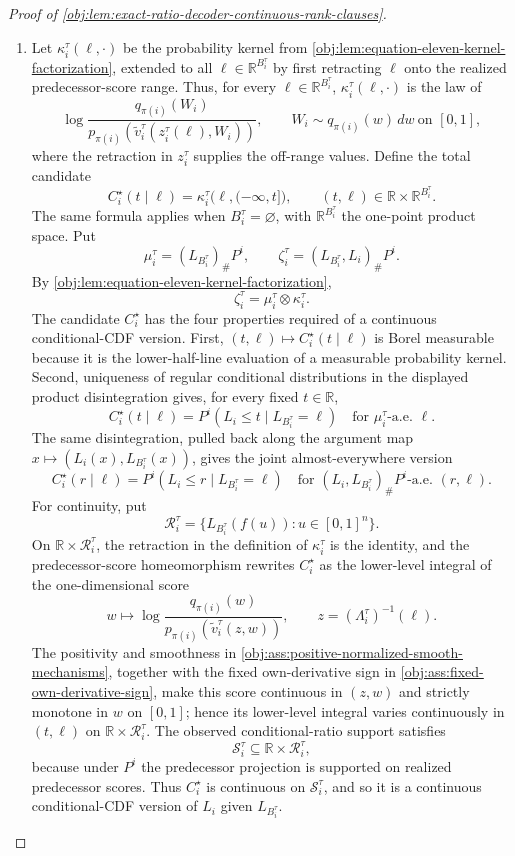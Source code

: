 \begin{proof}[Proof of \cref{obj:lem:exact-ratio-decoder-continuous-rank-clauses}]
\begin{enumerate}
\item Let \(\kappa_i^\tau(\ell,\cdot)\) be the probability kernel from \cref{obj:lem:equation-eleven-kernel-factorization}, extended to all \(\ell\in\mathbb R^{B_i^\tau}\) by first retracting \(\ell\) onto the realized predecessor-score range.  Thus, for every \(\ell\in\mathbb R^{B_i^\tau}\), \(\kappa_i^\tau(\ell,\cdot)\) is the law of
\[
\log\frac{q_{\pi(i)}(W_i)}
{p_{\pi(i)}\!\left(\widetilde v_i^\tau(z_i^\tau(\ell),W_i)\right)},
\qquad
W_i\sim q_{\pi(i)}(w)\,dw\ \text{on }[0,1],
\]
where the retraction in \(z_i^\tau\) supplies the off-range values.  Define the total candidate
\[
C_i^\star(t\mid \ell)
=
\kappa_i^\tau\bigl(\ell,(-\infty,t]\bigr),
\qquad
(t,\ell)\in\mathbb R\times\mathbb R^{B_i^\tau}.
\]
The same formula applies when \(B_i^\tau=\varnothing\), with \(\mathbb R^{B_i^\tau}\) the one-point product space.  Put
\[
\mu_i^\tau=(L_{B_i^\tau})_{\#}P^i,
\qquad
\zeta_i^\tau=(L_{B_i^\tau},L_i)_{\#}P^i .
\]
By \cref{obj:lem:equation-eleven-kernel-factorization},
\[
\zeta_i^\tau
=
\mu_i^\tau\otimes\kappa_i^\tau .
\]
The candidate \(C_i^\star\) has the four properties required of a continuous conditional-CDF version.  First, \((t,\ell)\mapsto C_i^\star(t\mid\ell)\) is Borel measurable because it is the lower-half-line evaluation of a measurable probability kernel.  Second, uniqueness of regular conditional distributions in the displayed product disintegration gives, for every fixed \(t\in\mathbb R\),
\[
C_i^\star(t\mid \ell)
=
P^i(L_i\le t\mid L_{B_i^\tau}=\ell)
\quad
\text{for }\mu_i^\tau\text{-a.e. }\ell .
\]
The same disintegration, pulled back along the argument map \(x\mapsto(L_i(x),L_{B_i^\tau}(x))\), gives the joint almost-everywhere version
\[
C_i^\star(r\mid \ell)
=
P^i(L_i\le r\mid L_{B_i^\tau}=\ell)
\quad
\text{for }(L_i,L_{B_i^\tau})_{\#}P^i\text{-a.e. }(r,\ell).
\]
For continuity, put
\[
\mathcal R_i^\tau
=
\{L_{B_i^\tau}(f(u)):u\in[0,1]^n\}.
\]
On \(\mathbb R\times\mathcal R_i^\tau\), the retraction in the definition of \(\kappa_i^\tau\) is the identity, and the predecessor-score homeomorphism rewrites \(C_i^\star\) as the lower-level integral of the one-dimensional score
\[
w\longmapsto
\log\frac{q_{\pi(i)}(w)}{p_{\pi(i)}(\widetilde v_i^\tau(z,w))},
\qquad z=(\Lambda_i^\tau)^{-1}(\ell).
\]
The positivity and smoothness in \cref{obj:ass:positive-normalized-smooth-mechanisms}, together with the fixed own-derivative sign in \cref{obj:ass:fixed-own-derivative-sign}, make this score continuous in \((z,w)\) and strictly monotone in \(w\) on \([0,1]\); hence its lower-level integral varies continuously in \((t,\ell)\) on \(\mathbb R\times\mathcal R_i^\tau\).  The observed conditional-ratio support satisfies
\[
\mathcal S_i^\tau
\subseteq
\mathbb R\times\mathcal R_i^\tau,
\]
because under \(P^i\) the predecessor projection is supported on realized predecessor scores.  Thus \(C_i^\star\) is continuous on \(\mathcal S_i^\tau\), and so it is a continuous conditional-CDF version of \(L_i\) given \(L_{B_i^\tau}\). %


\end{enumerate}
\end{proof}
